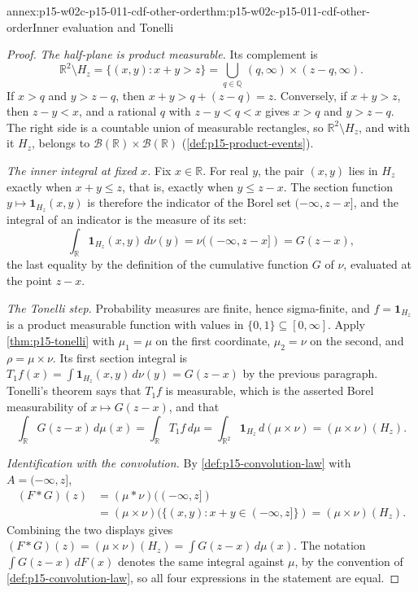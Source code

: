 \begin{annexitem}{annex:p15-w02c-p15-011-cdf-other-order}{thm:p15-w02c-p15-011-cdf-other-order}{Inner evaluation and Tonelli}
\begin{proof}
\emph{The half-plane is product measurable.} Its complement is
\[
 \mathbb R^2\setminus H_z=\{(x,y):x+y>z\}
   =\bigcup_{q\in\mathbb Q}\,(q,\infty)\times(z-q,\infty).
\]
If \(x>q\) and \(y>z-q\), then \(x+y>q+(z-q)=z\). Conversely, if
\(x+y>z\), then \(z-y<x\), and a rational \(q\) with \(z-y<q<x\) gives
\(x>q\) and \(y>z-q\). The right side is a countable union of measurable
rectangles, so \(\mathbb R^2\setminus H_z\), and with it \(H_z\), belongs
to \(\mathcal B(\mathbb R)\times\mathcal B(\mathbb R)\)
(\cref{def:p15-product-events}).

\emph{The inner integral at fixed \(x\).} Fix \(x\in\mathbb R\). For real
\(y\), the pair \((x,y)\) lies in \(H_z\) exactly when \(x+y\leq z\), that
is, exactly when \(y\leq z-x\). The section function
\(y\mapsto\mathbf1_{H_z}(x,y)\) is therefore the indicator of the Borel set
\((-\infty,z-x]\), and the integral of an indicator is the measure of its
set:
\[
 \int_{\mathbb R}\mathbf1_{H_z}(x,y)\,d\nu(y)
   =\nu((-\infty,z-x])=G(z-x),
\]
the last equality by the definition of the cumulative function \(G\) of
\(\nu\), evaluated at the point \(z-x\).

\emph{The Tonelli step.} Probability measures are finite, hence
sigma-finite, and \(f=\mathbf1_{H_z}\) is a product measurable function with
values in \(\{0,1\}\subseteq[0,\infty]\). Apply \cref{thm:p15-tonelli} with
\(\mu_1=\mu\) on the first coordinate, \(\mu_2=\nu\) on the second, and
\(\rho=\mu\times\nu\). Its first section integral is
\(T_1f(x)=\int\mathbf1_{H_z}(x,y)\,d\nu(y)=G(z-x)\) by the previous
paragraph. Tonelli's theorem says that \(T_1f\) is measurable, which is the
asserted Borel measurability of \(x\mapsto G(z-x)\), and that
\[
 \int_{\mathbb R}G(z-x)\,d\mu(x)=\int_{\mathbb R}T_1f\,d\mu
   =\int_{\mathbb R^2}\mathbf1_{H_z}\,d(\mu\times\nu)
   =(\mu\times\nu)(H_z).
\]

\emph{Identification with the convolution.} By
\cref{def:p15-convolution-law} with \(A=(-\infty,z]\),
\[
 \begin{aligned}
 (F*G)(z)&=(\mu*\nu)((-\infty,z])\\
   &=(\mu\times\nu)(\{(x,y):x+y\in(-\infty,z]\})
   =(\mu\times\nu)(H_z).
 \end{aligned}
\]
Combining the two displays gives
\((F*G)(z)=(\mu\times\nu)(H_z)=\int G(z-x)\,d\mu(x)\). The notation
\(\int G(z-x)\,dF(x)\) denotes the same integral against \(\mu\), by the
convention of \cref{def:p15-convolution-law}, so all four expressions in
the statement are equal.
\end{proof}
\end{annexitem}

